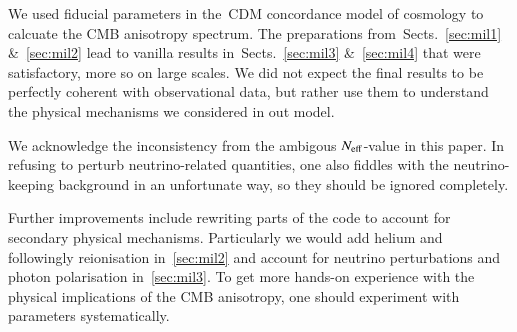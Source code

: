 




We used fiducial parameters in the~\textLambda CDM concordance model of cosmology to calcuate the CMB anisotropy spectrum. The preparations from~Sects.~\ref{sec:mil1} \&~\ref{sec:mil2} lead to vanilla results in~Sects.~\ref{sec:mil3} \&~\ref{sec:mil4} that were satisfactory, more so on large scales. We did not expect the final results to be perfectly coherent with observational data, but rather use them to understand the physical mechanisms we considered in out model.

We acknowledge the inconsistency from the ambigous $N_\mathrm{eff}$-value in this paper. In refusing to perturb neutrino-related quantities, one also fiddles with the neutrino-keeping background in an unfortunate way, so they should be ignored completely.

Further improvements include rewriting parts of the code to account for secondary physical mechanisms. Particularly we would add helium and followingly reionisation in~\cref{sec:mil2} and account for neutrino perturbations and photon polarisation in~\cref{sec:mil3}. To get more hands-on experience with the physical implications of the CMB anisotropy, one should experiment with parameters systematically.